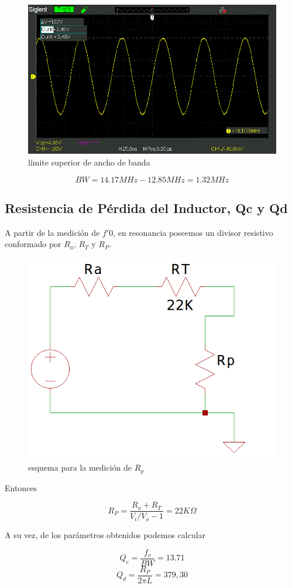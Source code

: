\begin{figure}[H]
    \centering
    \includegraphics[width=0.5\linewidth]{oscilo/SDS00022.jpg}
    \caption{límite superior de ancho de banda}
    \label{fig:enter-label}
\end{figure}


$$
BW = 14.17MHz - 12.85MHz = 1.32MHz
$$


\subsection{Resistencia de Pérdida del Inductor, Qc y Qd}

A partir de la medición de $f'0$, en resonancia poseemos un divisor resistivo conformado por $R_a$, $R_T$ y $R_P$.

\begin{figure}
    \centering
    \includegraphics[width=0.5\linewidth]{fig/rp.png}
    \caption{esquema para la medición de $R_p$}
    \label{fig:enter-label}
\end{figure}

Entonces

$$
R_P = \frac{R_a+R_T}{V_i/V_o-1} = 22K\Omega
$$

A su vez, de los parámetros obtenidos podemos calcular

$$
Q_c = \frac{f_o}{BW} = 13.71
$$
$$
Q_d = \frac{R_P}{2\pi L} = 379,30 
$$


